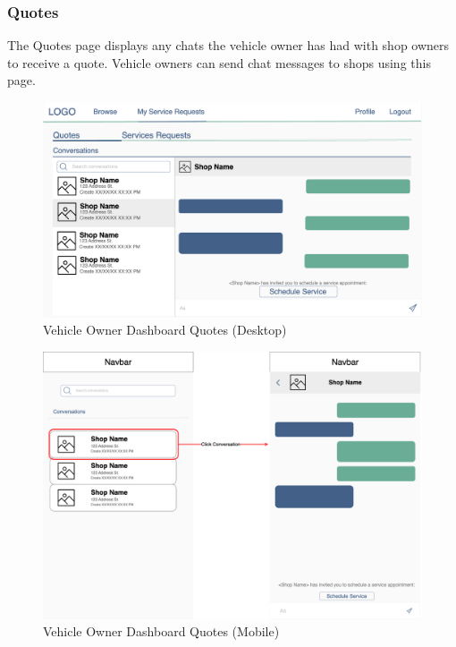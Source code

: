 \documentclass[12pt, titlepage]{article}
\begin{document}
\subsubsection{Quotes}
The Quotes page displays any chats the vehicle owner has had with shop owners to receive a quote.
Vehicle owners can send chat messages to shops using this page.

\begin{figure}[H]
	\centering
	\includegraphics[width=\textwidth]{mockups/Vehicle Owner Dashboard (Quotes) (Desktop).png}
	\caption{Vehicle Owner Dashboard \textemdash{} Quotes (Desktop)}
\end{figure}

\begin{figure}[H]
	\centering
	\includegraphics[width=\textwidth]{mockups/Vehicle Owner Dashboard (Quotes) (Mobile).png}
	\caption{Vehicle Owner Dashboard \textemdash{} Quotes (Mobile)}
\end{figure}
\end{document}
